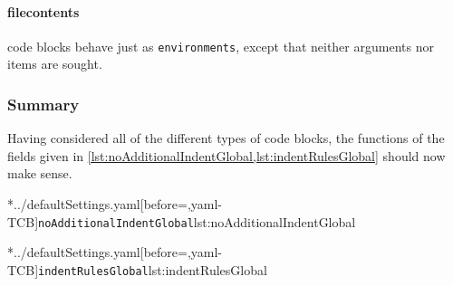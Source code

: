	\paragraph{filecontents} code blocks behave just as \texttt{environments}, except that
		neither arguments nor items are sought.

\subsubsection{Summary}
	Having considered all of the different types of code blocks, the functions of the fields
	given in \cref{lst:noAdditionalIndentGlobal,lst:indentRulesGlobal} should now make sense.

	\begin{widepage}
		\begin{minipage}{.47\linewidth}
			\cmhlistingsfromfile[style=noAdditionalIndentGlobal]*{../defaultSettings.yaml}[before=\centering,yaml-TCB]{\texttt{noAdditionalIndentGlobal}}{lst:noAdditionalIndentGlobal}
		\end{minipage}%
		\hfill
		\begin{minipage}{.47\linewidth}
			\cmhlistingsfromfile[style=indentRulesGlobal]*{../defaultSettings.yaml}[before=\centering,yaml-TCB]{\texttt{indentRulesGlobal}}{lst:indentRulesGlobal}
		\end{minipage}%
	\end{widepage}
